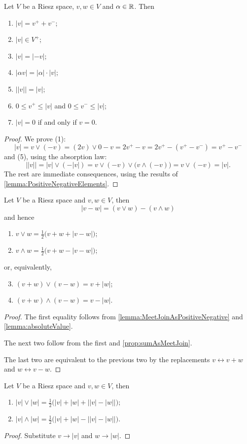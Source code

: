 \begin{lemma} \label{lemma:absoluteValue}
Let $V$ be a Riesz space, $v,w\in V$ and $\alpha\in \mathbb{R}$. Then
\begin{enumerate}
\item $|v| = v^+ + v^-$;
\item $|v| \in V^+$;
\item $|v| = |-v|$;
\item $|\alpha v| = |\alpha|\cdot |v|$;
\item $\big||v|\big| = |v|$;
\item $0 \leq v^+ \leq |v|$ and $0 \leq v^- \leq |v|$;
\item $|v| = 0$ \textup{if and only if} $v = 0$.
\end{enumerate}
\end{lemma}
\begin{proof}
We prove (1):
\[ |v| = v\vee (-v) = (2v)\vee 0 - v = 2v^+ - v = 2v^+ - (v^+ - v^-) = v^+ - v^- \]
and (5), using the absorption law:
\[ \big||v|\big| = |v|\vee (-|v|) = v \vee (-v) \vee \big( v\wedge (-v) \big) = v \vee (-v) = |v|. \]
The rest are immediate consequences, using the results of \ref{lemma:PositiveNegativeElements}.
\end{proof}

\begin{proposition}
Let $V$ be a Riesz space and $v,w\in V$, then
\[ |v - w| = (v \vee w) - (v \wedge w) \]
and hence
\begin{enumerate}
\item $v \vee w = \frac{1}{2}\big(v+w + |v - w|\big)$;
\item $v \wedge w = \frac{1}{2}\big(v+w - |v - w|\big)$;
\end{enumerate}
or, equivalently,
\begin{enumerate} \setcounter{enumi}{2}
\item $(v+w)\vee (v-w) = v + |w|$;
\item $(v+w)\wedge (v-w) = v - |w|$.
\end{enumerate}
\end{proposition}
\begin{proof}
The first equality follows from \ref{lemma:MeetJoinAsPositiveNegative} and \ref{lemma:absoluteValue}.

The next two follow from the first and \ref{prop:sumAsMeetJoin}.

The last two are equivalent to the previous two by the replacements $v \leftrightarrow v+w$ and $w \leftrightarrow v-w$.
\end{proof}
\begin{corollary} \label{corollary:meetJoinAbsoluteValues}
Let $V$ be a Riesz space and $v,w\in V$, then
\begin{enumerate}
\item $|v| \vee |w| = \frac{1}{2}\Big(|v|+|w| + \big||v| - |w|\big|\Big)$;
\item $|v| \wedge |w| = \frac{1}{2}\Big(|v|+|w| - \big||v| - |w|\big|\Big)$.
\end{enumerate}
\end{corollary}
\begin{proof}
Substitute $v\to |v|$ and $w\to |w|$.
\end{proof}

